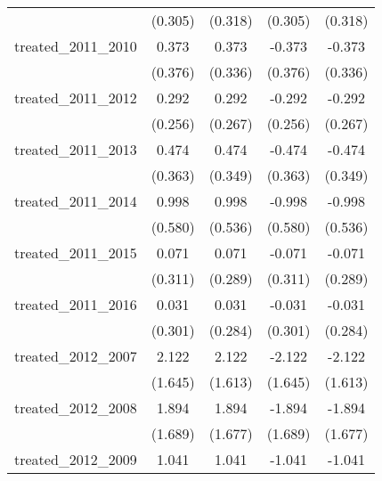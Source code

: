{\begin{tabular}{l*{4}{c}}
            &     (0.305)         &     (0.318)         &     (0.305)         &     (0.318)         \\
[1em]
treated\_2011\_2010&       0.373         &       0.373         &      -0.373         &      -0.373         \\
            &     (0.376)         &     (0.336)         &     (0.376)         &     (0.336)         \\
[1em]
treated\_2011\_2012&       0.292         &       0.292         &      -0.292         &      -0.292         \\
            &     (0.256)         &     (0.267)         &     (0.256)         &     (0.267)         \\
[1em]
treated\_2011\_2013&       0.474         &       0.474         &      -0.474         &      -0.474         \\
            &     (0.363)         &     (0.349)         &     (0.363)         &     (0.349)         \\
[1em]
treated\_2011\_2014&       0.998         &       0.998         &      -0.998         &      -0.998         \\
            &     (0.580)         &     (0.536)         &     (0.580)         &     (0.536)         \\
[1em]
treated\_2011\_2015&       0.071         &       0.071         &      -0.071         &      -0.071         \\
            &     (0.311)         &     (0.289)         &     (0.311)         &     (0.289)         \\
[1em]
treated\_2011\_2016&       0.031         &       0.031         &      -0.031         &      -0.031         \\
            &     (0.301)         &     (0.284)         &     (0.301)         &     (0.284)         \\
[1em]
treated\_2012\_2007&       2.122         &       2.122         &      -2.122         &      -2.122         \\
            &     (1.645)         &     (1.613)         &     (1.645)         &     (1.613)         \\
[1em]
treated\_2012\_2008&       1.894         &       1.894         &      -1.894         &      -1.894         \\
            &     (1.689)         &     (1.677)         &     (1.689)         &     (1.677)         \\
[1em]
treated\_2012\_2009&       1.041         &       1.041         &      -1.041         &      -1.041         \\

\end{tabular}}
